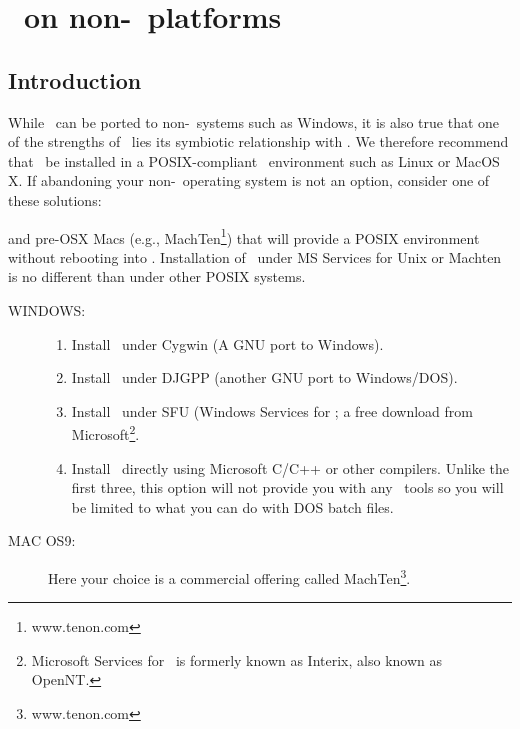 %
%
\chapter{\gmt\ on non-\UNIX\ platforms}
\thispagestyle{headings}

\section{Introduction}

While \GMT\ can be ported to non-\UNIX\ systems such as
Windows, it is also true that one of the
strengths of \GMT\ lies its symbiotic relationship with
\UNIX.  We therefore recommend that \GMT\ be installed in
a POSIX-compliant \UNIX\ environment such as Linux
or MacOS X.  If abandoning your non-\UNIX\ operating system
is not an option, consider one of these solutions:

and pre-OSX Macs (e.g., MachTen\footnote{www.tenon.com}) that will
provide a POSIX environment
without rebooting into \UNIX.  Installation of \GMT\ under MS
Services for Unix or Machten is no different than under other POSIX
\UNIX systems.

\begin{description}
\item [WINDOWS:]
\begin{enumerate}

\item Install \GMT\ under Cygwin (A GNU port to Windows). 

\item Install \GMT\ under DJGPP (another GNU port to Windows/DOS).

\item Install \GMT\ under SFU (Windows Services for \UNIX; a free download from
Microsoft\footnote{Microsoft Services for \UNIX\ is formerly known as Interix, also known as OpenNT.}.

\item Install \GMT\ directly using Microsoft C/C++ or other
compilers.  Unlike the first three, this option will not provide you with any
\UNIX\ tools so you will be limited to what you can do with
DOS batch files.


\end{enumerate}

\item [MAC OS9:] Here your choice is a commercial offering called MachTen\footnote{www.tenon.com}.
\end{description}

